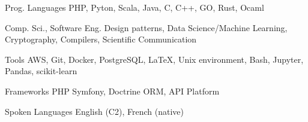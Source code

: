 


\begin{cvskills}
	
	
	\cvskill
	{Prog. Languages} %
	{PHP, Pyton, Scala, Java, C, C++, GO, Rust, Ocaml} %
	

	\cvskill
	{Comp. Sci., Software Eng.} %
	{Design patterns, Data Science/Machine Learning, Cryptography, Compilers, Scientific Communication} %

	
	\cvskill
	{Tools} %
	{AWS, Git, Docker, PostgreSQL, \LaTeX, Unix environment, Bash, Jupyter, Pandas, scikit-learn} %
	
	
	\cvskill
	{Frameworks} %
	{PHP Symfony, Doctrine ORM, API Platform} %
	
	
	\cvskill
	{Spoken Languages} %
	{English (C2), French (native)} %
	
	
\end{cvskills}